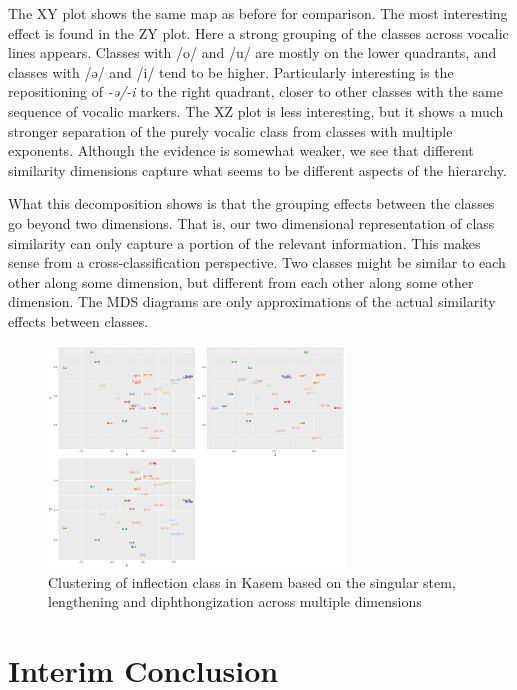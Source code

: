 The XY plot shows the same map as before for comparison. The most interesting effect is found in the ZY plot. Here a strong grouping of the classes across vocalic lines appears. Classes with /o/ and /u/ are mostly on the lower quadrants, and classes with /ə/ and /i/ tend to be higher. Particularly interesting is the repositioning of \textit{-ə/-i} to the right quadrant, closer to other classes with the same sequence of vocalic markers. The XZ plot is less interesting, but it shows a much stronger separation of the purely vocalic class from classes with multiple exponents. Although the evidence is somewhat weaker, we see that different similarity dimensions capture what seems to be different aspects of the hierarchy.

What this decomposition shows is that the grouping effects between the classes go beyond two dimensions. That is, our two dimensional representation of class similarity can only capture a portion of the relevant information. This makes sense from a cross-classification perspective. Two classes might be similar to each other along some dimension, but different from each other along some other dimension. The MDS diagrams are only approximations of the actual similarity effects between classes.

\begin{figure}
  \centering
  \includegraphics[width=0.7\textwidth]{./figures/kasem/kasem-nouns-hclust-sim-multi.pdf}
  \caption{Clustering of inflection class in Kasem based on the singular stem, lengthening and diphthongization across multiple dimensions}\label{fig:class-cluster-kasem-3}
\end{figure}

\section{Interim Conclusion}

